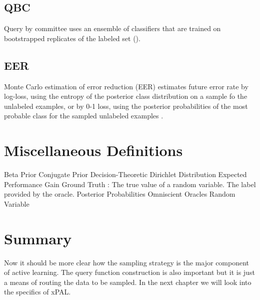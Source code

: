 \subsection{QBC}
Query by committee uses an ensemble of classifiers that are trained on bootstrapped replicates of the labeled set (\cite{seung1992qbc}).

\subsection{EER}
Monte Carlo estimation of error reduction (EER) estimates future error rate by log-loss, using the entropy of the posterior class distribution on a sample fo the unlabeled examples, or by 0-1 loss, using the posterior probabilities of the most probable class for the sampled unlabeled examples \cite{roy2001eer}.

\section{Miscellaneous Definitions}

Beta Prior
Conjugate Prior
Decision-Theoretic
Dirichlet Distribution
Expected Performance Gain
Ground Truth : The true value of a random variable. The label provided by the oracle.
Posterior Probabilities
Omniscient Oracles
Random Variable

\section{Summary}
Now it should be more clear how the sampling strategy is the major component of active learning. The query function construction is also important but it is just a means of routing the data to be sampled. In the next chapter we will look into the specifics of xPAL.
